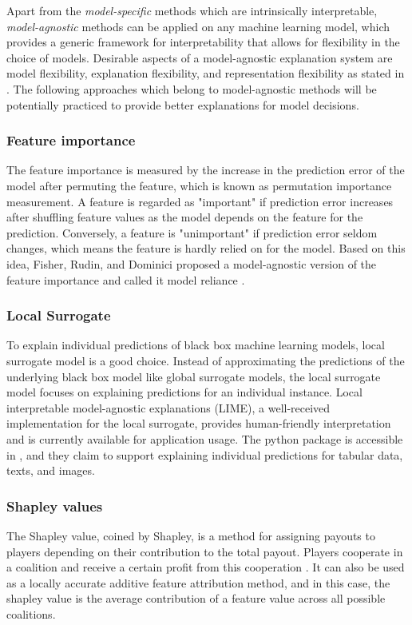 \documentclass[runningheads]{llncs}
\begin{document}
	Apart from the \textit{model-specific} methods which are intrinsically interpretable, \textit{model-agnostic} methods can be applied on any machine learning model, which provides a generic framework for interpretability that allows for flexibility in the choice of models. Desirable aspects of a model-agnostic explanation system are model flexibility, explanation flexibility, and representation flexibility as stated in \cite{ribeiro2016model}. The following approaches which belong to model-agnostic methods will be potentially practiced to provide better explanations for model decisions. 
	
	\subsubsection{Feature importance}
	The feature importance is measured by the increase in the prediction error of the model after permuting the feature, which is known as permutation importance measurement. A feature is regarded as "important" if prediction error increases after shuffling feature values as the model depends on the feature for the prediction. Conversely, a feature is "unimportant" if prediction error seldom changes, which means the feature is hardly relied on for the model. Based on this idea, Fisher, Rudin, and Dominici proposed a model-agnostic version of the feature importance and called it model reliance \cite{fisher2018model}.
	
	\subsubsection{Local Surrogate}
	To explain individual predictions of black box machine learning models, local surrogate model is a good choice. Instead of approximating the predictions of the underlying black box model like global surrogate models, the local surrogate model focuses on explaining predictions for an individual instance. Local interpretable model-agnostic explanations (LIME), a well-received implementation for the local surrogate, provides human-friendly interpretation and is currently available for application usage. The python package is accessible in \cite{lime}, and they claim to support explaining individual predictions for tabular data, texts, and images.
	
	\subsubsection{Shapley values }
	The Shapley value, coined by Shapley, is a method for assigning payouts to players depending on their contribution to the total payout. Players cooperate in a coalition and receive a certain profit from this cooperation \cite{shapley1953value}. It can also be used as a locally accurate additive feature attribution method, and in this case, the shapley value is the average contribution of a feature value across all possible coalitions.
	
\end{document}
